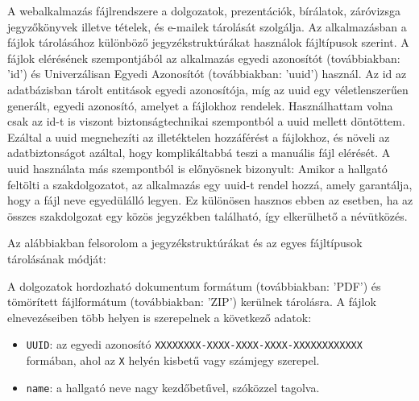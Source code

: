 
A webalkalmazás fájlrendszere a dolgozatok, prezentációk, bírálatok, záróvizsga jegyzőkönyvek illetve tételek, és e-mailek tárolását szolgálja. Az alkalmazásban a fájlok tárolásához különböző jegyzékstruktúrákat használok  fájltípusok szerint. A fájlok elérésének szempontjából az alkalmazás egyedi azonosítót (továbbiakban: 'id') és Univerzálisan Egyedi Azonosítót (továbbiakban: 'uuid') használ. Az id az adatbázisban tárolt entitások egyedi azonosítója, míg az uuid egy véletlenszerűen generált, egyedi azonosító, amelyet a fájlokhoz rendelek. Használhattam volna csak az id-t is viszont biztonságtechnikai szempontból a uuid mellett döntöttem. Ezáltal a uuid megnehezíti az illetéktelen hozzáférést a fájlokhoz, és növeli az adatbiztonságot azáltal, hogy komplikáltabbá teszi a manuális fájl elérését. A uuid használata más szempontból is előnyösnek bizonyult: Amikor a hallgató feltölti a szakdolgozatot, az alkalmazás egy uuid-t rendel hozzá, amely garantálja, hogy a fájl neve egyedülálló legyen. Ez különösen hasznos ebben az esetben, ha az összes szakdolgozat egy közös jegyzékben található, így elkerülhető a névütközés.

Az alábbiakban felsorolom a jegyzékstruktúrákat és az egyes fájltípusok tárolásának módját:

A dolgozatok hordozható dokumentum formátum (továbbiakban: 'PDF') és tömörített fájlformátum (továbbiakban: 'ZIP') kerülnek tárolásra. A fájlok elnevezéseiben több helyen is szerepelnek a következő adatok:

\begin{itemize}
\item \texttt{UUID}: az egyedi azonosító \texttt{XXXXXXXX-XXXX-XXXX-XXXX-XXXXXXXXXXXX} formában, ahol az \texttt{X} helyén kisbetű vagy számjegy szerepel.

\item \texttt{name}: a hallgató neve nagy kezdőbetűvel, szóközzel tagolva.
\end{itemize}

